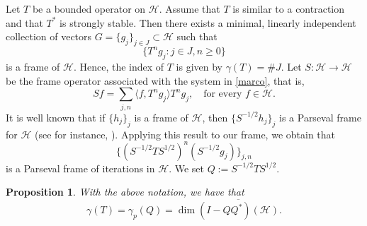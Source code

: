 \documentclass[a4paper,12pt]{amsart}
\def\HH{{\mathcal{H}}}
\newcommand{\scal}[1]{{\langle{#1}\rangle}}
\newtheorem{proposition}[theorem]{Proposition}
\theoremstyle{definition}
\begin{document}
Let $T$ be a bounded operator on $\HH$. Assume that $T$ is similar to a contraction and that $T^*$ is strongly stable. Then there exists a minimal, linearly independent collection of vectors 
$G=\{g_j\}_{j\in J}\subset\HH$ such that 
\begin{equation}\label{marco}
\{T^n g_j:j\in J,n\geqslant0\}
\end{equation}
is a frame of $\HH$. Hence, the index of $T$ is given by $\gamma(T)=\#J$. Let $S:\HH\to\HH$ be the frame operator associated with the system in \eqref{marco}, that is, 
\begin{equation*}
Sf=\sum_{j,n}\scal{f, T^n g_j}T^ng_j,\quad\text{for every }f\in\HH.
\end{equation*}
It is well known that if $\{h_j\}_j$ is a frame of $\HH$, then $\{S^{-1/2}h_j\}_j$ is a Parseval frame for $\HH$ (see for instance, 
\cite[Corollary 8.28]{Heil}). Applying this result to our frame, we obtain that 
\begin{equation*}
\{(S^{-1/2} T S^{1/2})^n (S^{-1/2} g_j)\}_{j,n}
\end{equation*}
is a Parseval frame of iterations in $\HH$. We set $Q:=S^{-1/2} T S^{1/2}$.
\begin{proposition}
With the above notation, we have that
\begin{equation*}
\gamma(T)=\gamma_p(Q)=\dim\overline{(I-QQ^*)(\HH)}.
\end{equation*}
\end{proposition}
\end{document}
